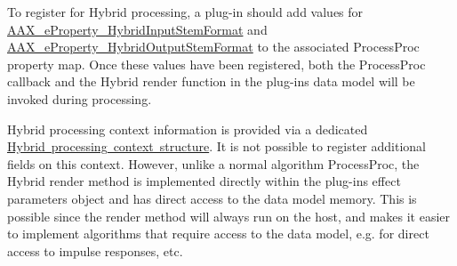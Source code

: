To register for Hybrid processing, a plug-\/in should add values for \mbox{\hyperlink{a00805_ga13e384f22825afd3db6d68395b79ce0da33a950bc2e02d38fc3be0a0ad8cc89b1}{A\+A\+X\+\_\+e\+Property\+\_\+\+Hybrid\+Input\+Stem\+Format}} and \mbox{\hyperlink{a00805_ga13e384f22825afd3db6d68395b79ce0dac30a4e73772e37267dfef39ae3122705}{A\+A\+X\+\_\+e\+Property\+\_\+\+Hybrid\+Output\+Stem\+Format}} to the associated Process\+Proc property map. Once these values have been registered, both the Process\+Proc callback and the Hybrid render function in the plug-\/in\textquotesingle{}s data model will be invoked during processing.

Hybrid processing context information is provided via a dedicated \mbox{\hyperlink{a01673}{Hybrid processing context structure}}. It is not possible to register additional fields on this context. However, unlike a normal algorithm Process\+Proc, the Hybrid render method is implemented directly within the plug-\/in\textquotesingle{}s effect parameters object and has direct access to the data model memory. This is possible since the render method will always run on the host, and makes it easier to implement algorithms that require access to the data model, e.\+g. for direct access to impulse responses, etc.

